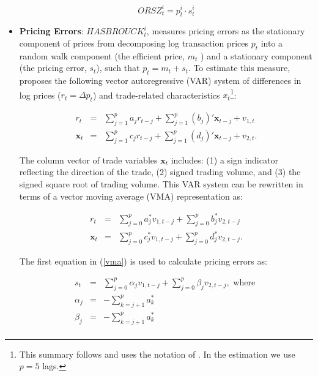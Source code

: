 \documentclass{article}
\begin{document}
\begin{itemize}
    \begin{equation*}\label{eq:qspr_pre}
    ORSZ_t^i=p_t^i \cdot s_t^i
    \end{equation*}

\item \textbf{\citet{hasbrouck1993assessing} Pricing Errors}: $HASBROUCK_t^i$, measures pricing errors as the stationary component of prices from decomposing log transaction prices $p_t$  into a random walk component (the efficient price, $m_t$ ) and a stationary component (the pricing error, $s_t$), such that $p_t=m_t+s_t$. To estimate this measure, \citet{hasbrouck1993assessing} proposes the following vector autoregressive (VAR) system of differences in log prices ($r_t=\Delta p_t$) and trade-related characteristics $x_t$\footnote{This summary follows and uses the notation of \citet{boehmer2013}. In the estimation we use $p=5$ lags.}:

    \begin{eqnarray}
    r_t &=& \sum_{j=1}^p a_j r_{t-j} + \sum_{j=1}^p (b_j)' \mathbf{x}_{t-j} + v_{1,t} \label{var} \\
    \mathbf{x}_t &=& \sum_{j=1}^p c_j r_{t-j} + \sum_{j=1}^p (d_j)' \mathbf{x}_{t-j} + v_{2,t}. \nonumber
    \end{eqnarray}

    The column vector of trade variables $\mathbf{x}_t$ includes: (1) a sign indicator reflecting the direction of the trade, (2) signed trading volume, and (3) the signed square root of trading volume. This VAR system can be rewritten in terms of a vector moving average (VMA) representation as:

     \begin{eqnarray}
    r_t &=& \sum_{j=0}^p a_j^{*} v_{1,t-j} + \sum_{j=0}^p b_j^{*} v_{2,t-j} \label{vma} \\
    \mathbf{x}_t &=& \sum_{j=0}^p c_j^{*} v_{1,t-j} + \sum_{j=0}^p d_j^{*} v_{2,t-j}. \nonumber
    \end{eqnarray}

   The first equation in (\ref{vma}) is used to calculate pricing errors as:

    \begin{eqnarray}
    s_t &=& \sum_{j=0}^p \alpha_j v_{1,t-j} + \sum_{j=0}^p \beta_j v_{2,t-j}, \text{ where }  \label{error}\\
    \alpha_j &=& -\sum_{k=j+1}^p a_k^{*} \nonumber \\
    \beta_j &=& -\sum_{k=j+1}^p a_k^{*} \nonumber \\
    \end{eqnarray}


\end{itemize}
\end{document}
